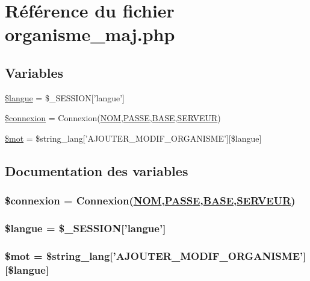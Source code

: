 \hypertarget{organisme__maj_8php}{
\section{R\'{e}f\'{e}rence du fichier organisme\_\-maj.php}
\label{organisme__maj_8php}
}
\subsection*{Variables}
\begin{CompactItemize}
\item 
\hyperlink{organisme__maj_8php_a0}{\$langue} = \$\_\-SESSION\mbox{[}'langue'\mbox{]}
\item 
\hyperlink{organisme__maj_8php_a1}{\$connexion} = Connexion(\hyperlink{pma__connect_8php_a0}{NOM},\hyperlink{pma__connect_8php_a1}{PASSE},\hyperlink{pma__connect_8php_a3}{BASE},\hyperlink{pma__connect_8php_a2}{SERVEUR})
\item 
\hyperlink{organisme__maj_8php_a2}{\$mot} = \$string\_\-lang\mbox{[}'AJOUTER\_\-MODIF\_\-ORGANISME'\mbox{]}\mbox{[}\$langue\mbox{]}
\end{CompactItemize}


\subsection{Documentation des variables}
\hypertarget{organisme__maj_8php_a1}{
\subsubsection[\$connexion]{\setlength{\rightskip}{0pt plus 5cm}\$connexion = Connexion(\hyperlink{pma__connect_8php_a0}{NOM},\hyperlink{pma__connect_8php_a1}{PASSE},\hyperlink{pma__connect_8php_a3}{BASE},\hyperlink{pma__connect_8php_a2}{SERVEUR})}}
\label{organisme__maj_8php_a1}


\hypertarget{organisme__maj_8php_a0}{
\subsubsection[\$langue]{\setlength{\rightskip}{0pt plus 5cm}\$langue = \$\_\-SESSION\mbox{[}'langue'\mbox{]}}}
\label{organisme__maj_8php_a0}


\hypertarget{organisme__maj_8php_a2}{
\subsubsection[\$mot]{\setlength{\rightskip}{0pt plus 5cm}\$mot = \$string\_\-lang\mbox{[}'AJOUTER\_\-MODIF\_\-ORGANISME'\mbox{]}\mbox{[}\$langue\mbox{]}}}
\label{organisme__maj_8php_a2}


